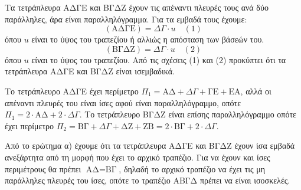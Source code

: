 \begin{alist}
\item Τα τετράπλευρα ΑΔΓΕ και ΒΓΔΖ έχουν τις απέναντι πλευρές τους ανά δύο παράλληλες, άρα είναι παραλληλόγραμμα.
Για τα εμβαδά τους έχουμε:
\[ (\text{ΑΔΓΕ}) = \Delta\Gamma \cdot u \quad (1) \]
όπου $u$ είναι το ύψος του τραπεζίου ή αλλιώς η απόσταση των βάσεών του.
\[ (\text{ΒΓΔΖ}) = \Delta\Gamma \cdot u \quad (2) \]
όπου $u$ είναι το ύψος του τραπεζίου.
Από τις σχέσεις (1) και (2) προκύπτει ότι τα τετράπλευρα ΑΔΓΕ και ΒΓΔΖ είναι ισεμβαδικά.
\item Το τετράπλευρο ΑΔΓΕ έχει περίμετρο $\Pi_1 = \text{ΑΔ} + \Delta\Gamma + \text{ΓΕ} + \text{ΕΑ}$, αλλά οι απέναντι πλευρές του είναι ίσες αφού είναι παραλληλόγραμμο, οπότε $\Pi_1 = 2 \cdot \text{ΑΔ} + 2 \cdot \Delta\Gamma$.
Το τετράπλευρο ΒΓΔΖ είναι επίσης παραλληλόγραμμο οπότε έχει περίμετρο $\Pi_2 = \text{ΒΓ} + \Delta\Gamma + \text{ΔΖ} + \text{ΖΒ} = 2 \cdot \text{ΒΓ} + 2 \cdot \Delta\Gamma$.
\item Από το ερώτημα α) έχουμε ότι τα τετράπλευρα ΑΔΓΕ και ΒΓΔΖ έχουν ίσα εμβαδά ανεξάρτητα από τη μορφή που έχει το αρχικό τραπέζιο. Για να έχουν και ίσες περιμέτρους θα πρέπει $\text{ΑΔ} = \text{ΒΓ}$, δηλαδή το αρχικό τραπέζιο να έχει τις μη παράλληλες πλευρές του ίσες, οπότε το τραπέζιο ΑΒΓΔ πρέπει να είναι ισοσκελές.
\end{alist}